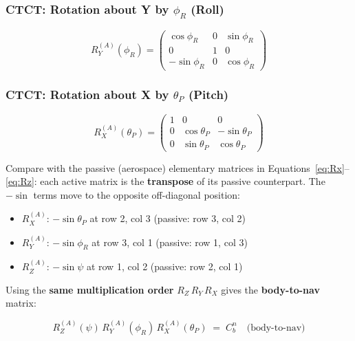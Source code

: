 \documentclass[12pt,a4paper]{article}
\begin{document}
\subsubsection*{CTCT: Rotation about Y by $\phi_R$ (Roll)}

\begin{equation}
  R_Y^{(A)}(\phi_R) = \begin{pmatrix}
    \cos\phi_R  & 0 & \sin\phi_R \\
    0            & 1 & 0            \\
    -\sin\phi_R & 0 & \cos\phi_R
  \end{pmatrix}
  \label{eq:RyA}
\end{equation}

\subsubsection*{CTCT: Rotation about X by $\theta_P$ (Pitch)}

\begin{equation}
  R_X^{(A)}(\theta_P) = \begin{pmatrix}
    1 & 0              & 0               \\
    0 & \cos\theta_P  & -\sin\theta_P  \\
    0 & \sin\theta_P  & \cos\theta_P
  \end{pmatrix}
  \label{eq:RxA}
\end{equation}

\begin{keybox}
Compare with the passive (aerospace) elementary matrices in
Equations~\eqref{eq:Rx}--\eqref{eq:Rz}: each active matrix is the
\textbf{transpose} of its passive counterpart.
The $-\sin$ terms move to the opposite off-diagonal position:
\begin{itemize}
  \item $R_X^{(A)}$: $-\sin\theta_P$ at row 2, col 3 \quad
        (passive: row 3, col 2)
  \item $R_Y^{(A)}$: $-\sin\phi_R$ at row 3, col 1 \quad
        (passive: row 1, col 3)
  \item $R_Z^{(A)}$: $-\sin\psi$ at row 1, col 2 \quad
        (passive: row 2, col 1)
\end{itemize}
\end{keybox}

Using the \textbf{same multiplication order} $R_Z\,R_Y\,R_X$ gives the
\textbf{body-to-nav} matrix:

\begin{equation}
\boxed{
  R_Z^{(A)}(\psi)\, R_Y^{(A)}(\phi_R)\, R_X^{(A)}(\theta_P)
  \;=\; C_b^n
  \quad\text{(body-to-nav)}
}
\end{equation}
\end{document}
